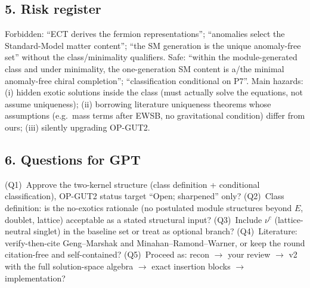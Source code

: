 \subsection*{5. Risk register}
Forbidden: ``ECT derives the fermion representations'';
``anomalies select the Standard-Model matter content'';
``the SM generation is the unique anomaly-free set'' without the
class/minimality qualifiers.
Safe: ``within the module-generated class and under minimality,
the one-generation SM content is a/the minimal anomaly-free chiral
completion''; ``classification conditional on P7''.
Main hazards: (i) hidden exotic solutions inside the class
(must actually solve the equations, not assume uniqueness);
(ii) borrowing literature uniqueness theorems whose assumptions
(e.g.\ mass terms after EWSB, no gravitational condition) differ
from ours; (iii) silently upgrading OP-GUT2.

\subsection*{6. Questions for GPT}
(Q1)~Approve the two-kernel structure (class definition +
conditional classification), OP-GUT2 status target ``Open;
sharpened'' only?
(Q2)~Class definition: is the no-exotics rationale (no postulated
module structures beyond $E$, doublet, lattice) acceptable as a
stated structural input?
(Q3)~Include $\nu^c$ (lattice-neutral singlet) in the baseline set
or treat as optional branch?
(Q4)~Literature: verify-then-cite Geng--Marshak and
Minahan--Ramond--Warner, or keep the round citation-free and
self-contained?
(Q5)~Proceed as: recon $\to$ your review $\to$ v2 with the full
solution-space algebra $\to$ exact insertion blocks $\to$
implementation?
